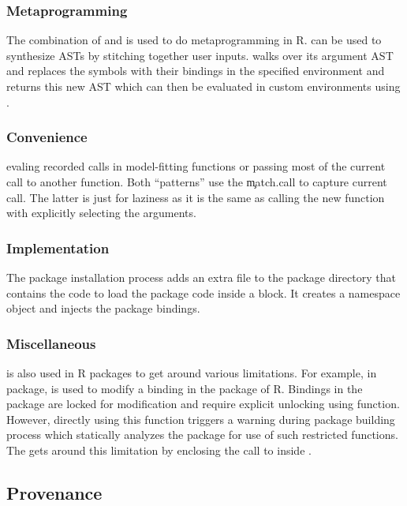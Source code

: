 \documentclass[conference]{IEEEtran}
\begin{document}
  \subsubsection{Metaprogramming} The combination of \eval and \substitute is
  used to do metaprogramming in R. \substitute can be used to synthesize ASTs by
  stitching together user inputs. \substitute walks over its argument AST and
  replaces the symbols with their bindings in the specified environment and
  returns this new AST which can then be evaluated in custom environments using
  \eval.

  \subsubsection{Convenience}
  evaling recorded calls in model-fitting functions or passing most of the
  current call to another function. Both ``patterns'' use the \c{match.call} to
  capture current call. The latter is just for laziness as it is the same as
  calling the new function with explicitly selecting the arguments.

  \subsubsection{Implementation}
  The package installation process adds an extra file to the package directory
  that contains the code to load the package code inside a \local block. It
  creates a namespace object and injects the package bindings.

  \subsubsection{Miscellaneous} \eval is also used in R packages to get around
  various limitations. For example, in \datatable package, \eval is used to modify
  a binding in the \base package of R. Bindings in the \base package are locked
  for modification and require explicit unlocking using \unlockBinding function.
  However, directly using this function triggers a warning during package building
  process which statically analyzes the package for use of such restricted
  functions. The \datatable gets around this limitation by enclosing the call to
  \unlockBinding inside \eval.
  
\subsection{Provenance}
\end{document}
